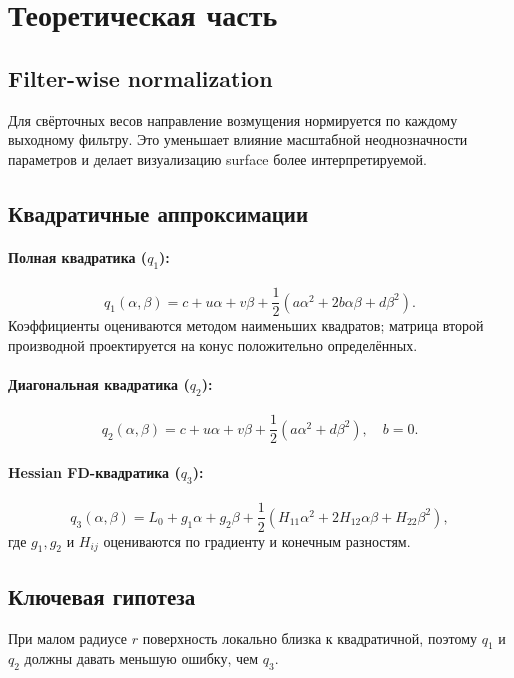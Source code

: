 \section{Теоретическая часть}

\subsection{Filter-wise normalization}
Для свёрточных весов направление возмущения нормируется по каждому выходному фильтру. Это уменьшает влияние масштабной неоднозначности параметров и делает визуализацию surface более интерпретируемой.

\subsection{Квадратичные аппроксимации}
\paragraph{Полная квадратика ($q_1$):}
\[
q_1(\alpha,\beta)=c+u\alpha+v\beta+\frac{1}{2}(a\alpha^2+2b\alpha\beta+d\beta^2).
\]
Коэффициенты оцениваются методом наименьших квадратов; матрица второй производной проектируется на конус положительно определённых.

\paragraph{Диагональная квадратика ($q_2$):}
\[
q_2(\alpha,\beta)=c+u\alpha+v\beta+\frac{1}{2}(a\alpha^2+d\beta^2),\quad b=0.
\]

\paragraph{Hessian FD-квадратика ($q_3$):}
\[
q_3(\alpha,\beta)=L_0+g_1\alpha+g_2\beta+\frac{1}{2}(H_{11}\alpha^2+2H_{12}\alpha\beta+H_{22}\beta^2),
\]
где $g_1,g_2$ и $H_{ij}$ оцениваются по градиенту и конечным разностям.

\subsection{Ключевая гипотеза}
При малом радиусе $r$ поверхность локально близка к квадратичной, поэтому $q_1$ и $q_2$ должны давать меньшую ошибку, чем $q_3$.
